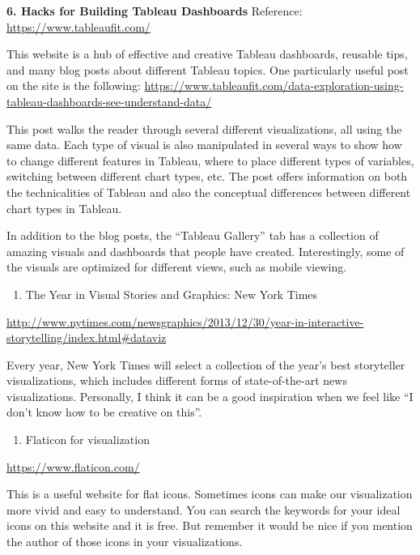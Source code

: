 \documentclass[]{book}
\providecommand{\tightlist}{%
  \setlength{\itemsep}{0pt}\setlength{\parskip}{0pt}}
\theoremstyle{definition}
\theoremstyle{definition}
\theoremstyle{definition}
\theoremstyle{remark}
\begin{document}
\textbf{6. Hacks for Building Tableau Dashboards} Reference:
\url{https://www.tableaufit.com/}

This website is a hub of effective and creative Tableau dashboards,
reusable tips, and many blog posts about different Tableau topics. One
particularly useful post on the site is the following:
\url{https://www.tableaufit.com/data-exploration-using-tableau-dashboards-see-understand-data/}

This post walks the reader through several different visualizations, all
using the same data. Each type of visual is also manipulated in several
ways to show how to change different features in Tableau, where to place
different types of variables, switching between different chart types,
etc. The post offers information on both the technicalities of Tableau
and also the conceptual differences between different chart types in
Tableau.

In addition to the blog posts, the ``Tableau Gallery'' tab has a
collection of amazing visuals and dashboards that people have created.
Interestingly, some of the visuals are optimized for different views,
such as mobile viewing.

\begin{enumerate}
\def\labelenumi{\arabic{enumi}.}
\setcounter{enumi}{3}
\tightlist
\item
  The Year in Visual Stories and Graphics: New York Times
\end{enumerate}

\url{http://www.nytimes.com/newsgraphics/2013/12/30/year-in-interactive-storytelling/index.html\#dataviz}

Every year, New York Times will select a collection of the year's best
storyteller visualizations, which includes different forms of
state-of-the-art news visualizations. Personally, I think it can be a
good inspiration when we feel like ``I don't know how to be creative on
this''.

\begin{enumerate}
\def\labelenumi{\arabic{enumi}.}
\setcounter{enumi}{4}
\tightlist
\item
  Flaticon for visualization
\end{enumerate}

\url{https://www.flaticon.com/}

This is a useful website for flat icons. Sometimes icons can make our
visualization more vivid and easy to understand. You can search the
keywords for your ideal icons on this website and it is free. But
remember it would be nice if you mention the author of those icons in
your visualizations.


\end{document}
